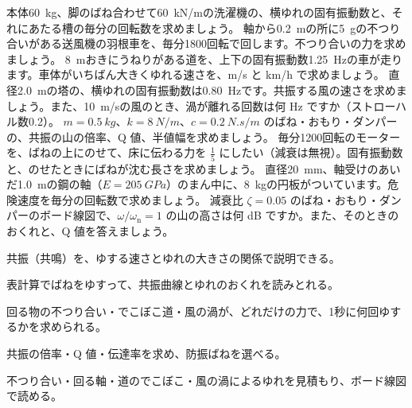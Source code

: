 \bkendproblems
{}
\bkproblem 本体\qty{60}{kg}、脚のばね合わせて\qty{60}{kN/m}の洗濯機の、横ゆれの固有振動数と、それにあたる槽の毎分の回転数を求めましょう。
\bkproblem 軸から\qty{0.2}{m}の所に\qty{5}{g}の不つり合いがある送風機の羽根車を、毎分1800回転で回します。不つり合いの力を求めましょう。
\bkproblem \qty{8}{m}おきにうねりがある道を、上下の固有振動数\qty{1.25}{Hz}の車が走ります。車体がいちばん大きくゆれる速さを、m/s と km/h で求めましょう。
\bkproblem 直径\qty{2.0}{m}の塔の、横ゆれの固有振動数は\qty{0.80}{Hz}です。共振する風の速さを求めましょう。また、\qty{10}{m/s}の風のとき、渦が離れる回数は何 Hz ですか（ストローハル数0.2）。
\bkproblem $m=\qty{0.5}{kg}$、$k=\qty{8}{N/m}$、$c=\qty{0.2}{N.s/m}$ のばね・おもり・ダンパーの、共振の山の倍率、Q 値、半値幅を求めましょう。
\bkproblem 毎分1200回転のモーターを、ばねの上にのせて、床に伝わる力を $\tfrac{1}{5}$ にしたい（減衰は無視）。固有振動数と、のせたときにばねが沈む長さを求めましょう。
\bkproblem 直径\qty{20}{mm}、軸受けのあいだ\qty{1.0}{m}の鋼の軸（$E=\qty{205}{GPa}$）のまん中に、\qty{8}{kg}の円板がついています。危険速度を毎分の回転数で求めましょう。
\bkproblem 減衰比 $\zeta=0.05$ のばね・おもり・ダンパーのボード線図で、$\omega/\omega_{\mathrm n}=1$ の山の高さは何 dB ですか。また、そのときのおくれと、Q 値を答えましょう。

\begin{furikaeri}
\begin{checklist}
\item 共振（共鳴）を、ゆする速さとゆれの大きさの関係で説明できる。
\item 表計算でばねをゆすって、共振曲線とゆれのおくれを読みとれる。
\item 回る物の不つり合い・でこぼこ道・風の渦が、どれだけの力で、1秒に何回ゆするかを求められる。
\item 共振の倍率・Q 値・伝達率を求め、防振ばねを選べる。
\item 不つり合い・回る軸・道のでこぼこ・風の渦によるゆれを見積もり、ボード線図で読める。
\end{checklist}
\end{furikaeri}

